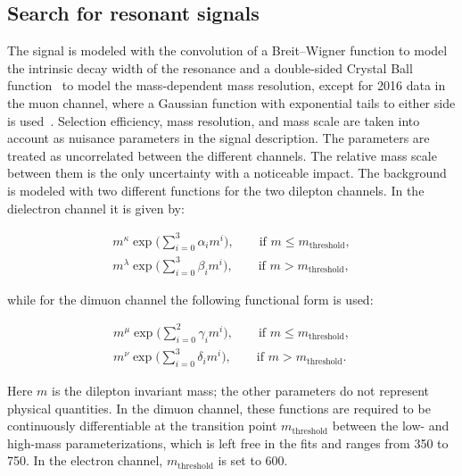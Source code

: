 \documentclass[11pt,twoside,a4paper,cmspaper,final,collab]{cms-tdr}
\begin{document}
\subsection{Search for resonant signals}
The signal is modeled with the convolution of a Breit--Wigner function to model the intrinsic decay width of the resonance and a double-sided Crystal Ball function~\cite{Oreglia:1980cs} to model the mass-dependent mass resolution, except for 2016 data in the muon channel, where a Gaussian function with exponential tails to either side is used~\cite{delAmoSanchez:2010ae}. Selection efficiency, mass resolution, and mass scale are taken into account as nuisance parameters in the signal description. The parameters are treated as uncorrelated between the different channels. The relative mass scale between them is the only uncertainty with a noticeable impact.
The background is modeled with two different functions for the two dilepton channels. In the dielectron channel it is given by:
\begin{linenomath} 
\begin{equation}
\label{eq:shapebckgELE}
\begin{split}
m^{\kappa}\exp\Biggl(\sum\limits_{i=0}^3 \alpha_{i} m^{i}\Biggr),\qquad \text{if $m \le m_{\text{threshold}}$}, \\
m^{\lambda}\exp\Biggl(\sum\limits_{i=0}^3 \beta_{i} m^{i}\Biggr),\qquad \text{if $m > m_{\text{threshold}} $},
\end{split}
\end{equation}
\end{linenomath} 
while for the dimuon channel the following functional form is used:
\begin{linenomath} 
\begin{equation}
\label{eq:shapebckgMUO}
\begin{split}
m^{\mu}\exp\Biggl(\sum\limits_{i=0}^2 \gamma_{i} m^{i}\Biggr),\qquad \text{if $m \le m_{\text{threshold}}$}, \\
m^{\nu}\exp\Biggl(\sum\limits_{i=0}^3 \delta_{i} m^{i}\Biggr),\qquad \text{if $m > m_{\text{threshold}}$}.
\end{split}
\end{equation}
\end{linenomath}
Here $m$ is the dilepton invariant mass; the other parameters do not represent physical quantities.
In the dimuon channel, these functions are required to be continuously differentiable at the transition point $m_{\mathrm{threshold}}$ between the low- and high-mass parameterizations, which is left free in the fits and ranges from 350 to 750\GeV. In the electron channel, $m_{\mathrm{threshold}}$ is set to 600\GeV.
\end{document}
